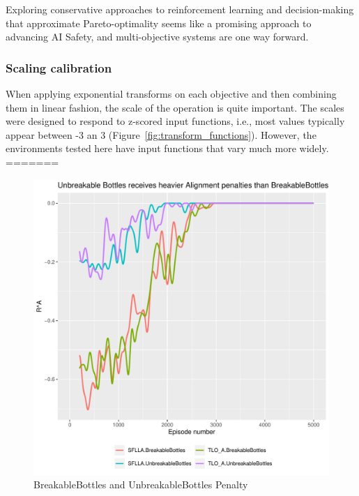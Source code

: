 Exploring conservative approaches to reinforcement learning and decision-making that approximate Pareto-optimality seems like a promising approach to advancing AI Safety, and multi-objective systems are one way forward.%

\subsubsection{Scaling calibration}

When applying exponential transforms on each objective and then combining them in linear fashion, the scale of the operation is quite important. The scales were designed to respond to z-scored input functions, i.e., most values typically appear between -3 an 3 (Figure~\ref{fig:transform_functions}). However, the environments tested here have input functions that vary much more widely.
=======
\begin{figure}
  \includegraphics[width=\columnwidth]{output/penalty_plot2.pdf}
  \caption{BreakableBottles and UnbreakableBottles Penalty
  }
   \label{fig:online_performance}
 \end{figure}
 
